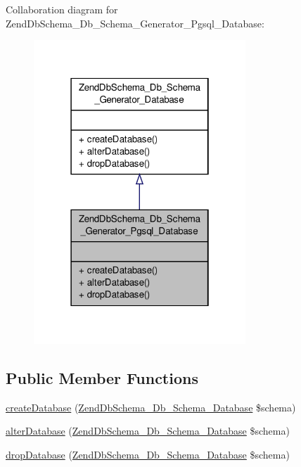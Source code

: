 Collaboration diagram for Zend\-Db\-Schema\-\_\-\-Db\-\_\-\-Schema\-\_\-\-Generator\-\_\-\-Pgsql\-\_\-\-Database\-:\nopagebreak
\begin{figure}[H]
\begin{center}
\leavevmode
\includegraphics[width=226pt]{classZendDbSchema__Db__Schema__Generator__Pgsql__Database__coll__graph}
\end{center}
\end{figure}
\subsection*{Public Member Functions}
\begin{DoxyCompactItemize}
\item 
\hyperlink{classZendDbSchema__Db__Schema__Generator__Pgsql__Database_a0a232123d02ab149db3309430ad8661e}{create\-Database} (\hyperlink{classZendDbSchema__Db__Schema__Database}{Zend\-Db\-Schema\-\_\-\-Db\-\_\-\-Schema\-\_\-\-Database} \$schema)
\item 
\hyperlink{classZendDbSchema__Db__Schema__Generator__Pgsql__Database_a4d4b5c6abc51a4ab72fc480602f502c3}{alter\-Database} (\hyperlink{classZendDbSchema__Db__Schema__Database}{Zend\-Db\-Schema\-\_\-\-Db\-\_\-\-Schema\-\_\-\-Database} \$schema)
\item 
\hyperlink{classZendDbSchema__Db__Schema__Generator__Pgsql__Database_ad5abe9239fea98c39605aeb77f6ca268}{drop\-Database} (\hyperlink{classZendDbSchema__Db__Schema__Database}{Zend\-Db\-Schema\-\_\-\-Db\-\_\-\-Schema\-\_\-\-Database} \$schema)
\end{DoxyCompactItemize}


